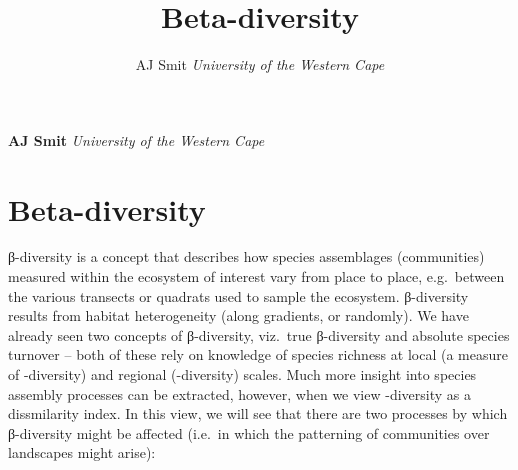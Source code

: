 \documentclass[10pt,a4,]{article}
\title{Beta-diversity  }
\author{\Large AJ
Smit\vspace{0.05in} \newline\normalsize\emph{University of the Western
Cape}  }
\date{}
\newcommand*{\authorfont}{\fontfamily{phv}\selectfont}
\begin{document}

{%
\setlength{\parindent}{0pt}
\thispagestyle{plain}
{\fontsize{18}{20}\selectfont\raggedright
\maketitle  %
}
{
   \vskip 13.5pt\relax \normalsize\fontsize{11}{12}
\textbf{\authorfont AJ Smit} \hskip 15pt \emph{\small University of the
Western Cape}   
}
}



\vskip 6.5pt

\noindent 

\section{Beta-diversity}

β-diversity is a concept that describes how species assemblages
(communities) measured within the ecosystem of interest vary from place
to place, e.g.~between the various transects or quadrats used to sample
the ecosystem. β-diversity results from habitat heterogeneity (along
gradients, or randomly). We have already seen two concepts of
β-diversity, viz.~true β-diversity and absolute species turnover -- both
of these rely on knowledge of species richness at local (a measure of
\textalpha-diversity) and regional (\textgamma-diversity) scales. Much
more insight into species assembly processes can be extracted, however,
when we view \textbeta-diversity as a dissmilarity index. In this view,
we will see that there are two processes by which β-diversity might be
affected (i.e.~in which the patterning of communities over landscapes
might arise):
\end{document}
